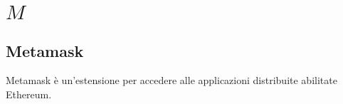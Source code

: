 \section{\quad$M\quad$}
\subsection{Metamask}
Metamask è un'estensione per accedere alle applicazioni distribuite abilitate Ethereum.
